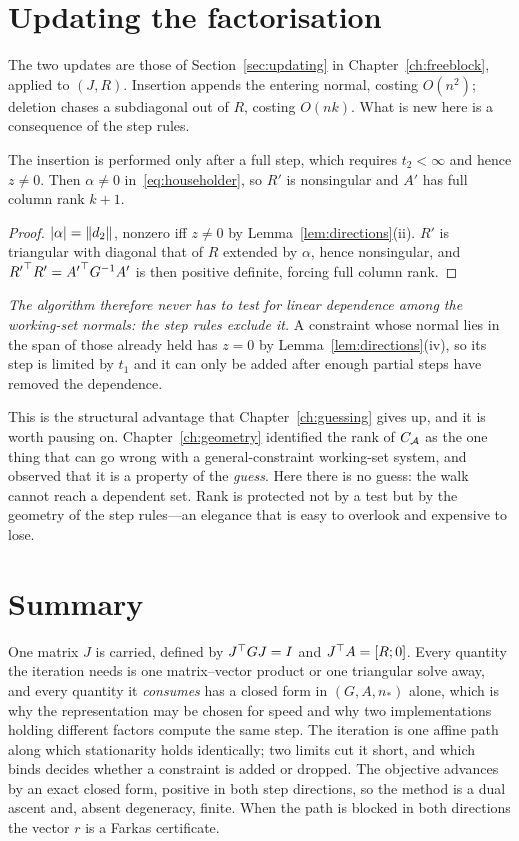 \section{Updating the factorisation}
\label{sec:updates}

The two updates are those of Section~\ref{sec:updating} in
Chapter~\ref{ch:freeblock}, applied to $(J,R)$. Insertion appends the entering
normal, costing $O(n^2)$; deletion chases a subdiagonal out of $R$, costing
$O(nk)$. What is new here is a consequence of the step rules.

\begin{proposition}
\label{prop:rank}
The insertion is performed only after a full step, which requires $t_2 < \infty$
and hence $z \ne 0$. Then $\alpha \ne 0$ in~\eqref{eq:householder}, so $R'$ is
nonsingular and $A'$ has full column rank $k+1$.
\end{proposition}

\begin{proof}
$|\alpha| = \lVert d_2 \rVert$, nonzero iff $z \ne 0$ by Lemma~\ref{lem:directions}(ii).
$R'$ is triangular with diagonal that of $R$ extended by $\alpha$, hence
nonsingular, and ${R'}^{\top} R' = {A'}^{\top} G^{-1}A'$ is then positive definite, forcing
full column rank.
\end{proof}

\emph{The algorithm therefore never has to test for linear dependence among the
working-set normals: the step rules exclude it.} A constraint whose normal lies in
the span of those already held has $z = 0$ by Lemma~\ref{lem:directions}(iv), so its
step is limited by $t_1$ and it can only be added after enough partial steps have
removed the dependence.

This is the structural advantage that Chapter~\ref{ch:guessing} gives up, and it is
worth pausing on. Chapter~\ref{ch:geometry} identified the rank of $C_{\mathcal{A}}$ as
the one thing that can go wrong with a general-constraint working-set system, and
observed that it is a property of the \emph{guess}. Here there is no guess: the
walk cannot reach a dependent set. Rank is protected not by a test but by the
geometry of the step rules---an elegance that is easy to overlook and expensive to
lose.

\section{Summary}

One matrix $J$ is carried, defined by $J^{\top} G J = I$ and $J^{\top} A = [R;0]$. Every
quantity the iteration needs is one matrix--vector product or one triangular solve
away, and every quantity it \emph{consumes} has a closed form in $(G,A,n_*)$ alone,
which is why the representation may be chosen for speed and why two implementations
holding different factors compute the same step. The iteration is one affine path
along which stationarity holds identically; two limits cut it short, and which binds
decides whether a constraint is added or dropped. The objective advances by an exact
closed form, positive in both step directions, so the method is a dual ascent and,
absent degeneracy, finite. When the path is blocked in both directions the vector
$r$ is a Farkas certificate.

